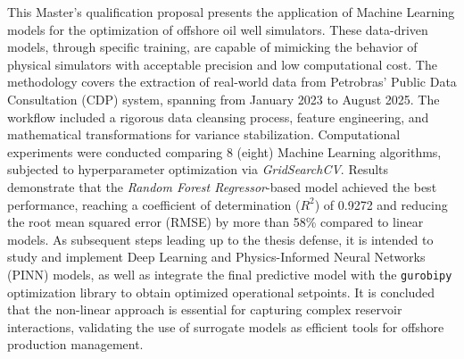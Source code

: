 This Master's qualification proposal presents the application of Machine Learning models for the optimization of offshore oil well simulators. These data-driven models, through specific training, are capable of mimicking the behavior of physical simulators with acceptable precision and low computational cost.
The methodology covers the extraction of real-world data from Petrobras' Public Data Consultation (CDP) system, spanning from January 2023 to August 2025. 
The workflow included a rigorous data cleansing process, feature engineering, and mathematical transformations for variance stabilization.
Computational experiments were conducted comparing 8 (eight) Machine Learning algorithms, subjected to hyperparameter optimization via \textit{GridSearchCV}. 
Results demonstrate that the \textit{Random Forest Regressor}-based model achieved the best performance, reaching a coefficient of determination ($R^2$) of 0.9272 and reducing the root mean squared error (RMSE) by more than 58\% compared to linear models.
As subsequent steps leading up to the thesis defense, it is intended to study and implement Deep Learning and Physics-Informed Neural Networks (PINN) models, as well as integrate the final predictive model with the \texttt{gurobipy} optimization library to obtain optimized operational setpoints.
It is concluded that the non-linear approach is essential for capturing complex reservoir interactions, validating the use of surrogate models as efficient tools for offshore production management.


